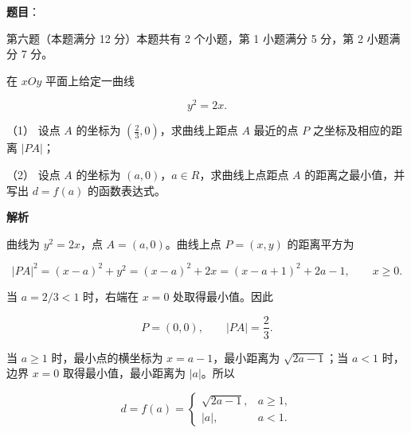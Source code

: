 \begin{answer}

\textbf{题目}：

第六题（本题满分 12 分）本题共有 2 个小题，第 1 小题满分 5 分，第 2 小题满分 7 分。

在 $xOy$ 平面上给定一曲线

\nopagebreak[4]
\[
y^2=2x.
\]

（1） 设点 $A$ 的坐标为 $\left(\frac23,0\right)$，求曲线上距点 $A$ 最近的点 $P$ 之坐标及相应的距离 $|PA|$；

（2） 设点 $A$ 的坐标为 $(a,0)$，$a\in R$，求曲线上点距点 $A$ 的距离之最小值，并写出 $d=f(a)$ 的函数表达式。

\textbf{解析}

曲线为 $y^2=2x$，点 $A=(a,0)$。曲线上点 $P=(x,y)$ 的距离平方为

\nopagebreak[4]
\[
|PA|^2=(x-a)^2+y^2
=(x-a)^2+2x
=\left(x-a+1\right)^2+2a-1,
\qquad x\ge0.
\]


当 $a=2/3<1$ 时，右端在 $x=0$ 处取得最小值。因此

\nopagebreak[4]
\[
P=(0,0),\qquad |PA|=\frac23.
\]


当 $a\ge1$ 时，最小点的横坐标为 $x=a-1$，最小距离为 $\sqrt{2a-1}$；当 $a<1$ 时，边界 $x=0$ 取得最小值，最小距离为 $|a|$。所以

\nopagebreak[4]
\[
d=f(a)=
\begin{cases}
\sqrt{2a-1},&a\ge1,\\
|a|,&a<1.
\end{cases}
\]



\end{answer}
